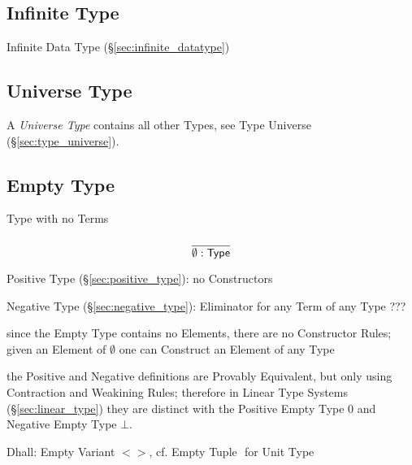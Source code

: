 \subsection{Infinite Type}\label{sec:infinite_type}

Infinite Data Type (\S\ref{sec:infinite_datatype})



\subsection{Universe Type}\label{sec:universe_type}

A \emph{Universe Type} contains all other Types, see Type Universe
(\S\ref{sec:type_universe}).



\subsection{Empty Type}\label{sec:empty_type}

Type with no Terms

\[
  \frac{}
  {\emptyset:\mathsf{Type}}
\]


Positive Type (\S\ref{sec:positive_type}): no Constructors

Negative Type (\S\ref{sec:negative_type}): Eliminator for any Term of
any Type ???

since the Empty Type contains no Elements, there are no Constructor
Rules; given an Element of $\emptyset$ one can Construct an Element of
any Type

the Positive and Negative definitions are Provably Equivalent, but
only using Contraction and Weakining Rules; therefore in Linear Type
Systems (\S\ref{sec:linear_type}) they are distinct with the Positive
Empty Type $0$ and Negative Empty Type $\bot$.

Dhall: Empty Variant $<>$, cf. Empty Tuple ${}$ for Unit Type



